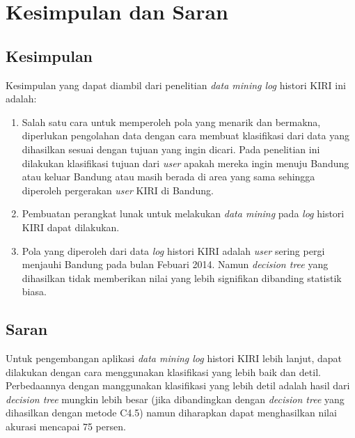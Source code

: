 \chapter{Kesimpulan dan Saran}

\section{Kesimpulan}

Kesimpulan yang dapat diambil dari penelitian \textsl{data mining log} histori KIRI ini adalah:

\begin{enumerate}
\item Salah satu cara untuk memperoleh pola yang menarik dan bermakna, diperlukan pengolahan data dengan cara membuat klasifikasi dari data yang dihasilkan sesuai dengan tujuan yang ingin dicari. Pada penelitian ini dilakukan klasifikasi tujuan dari \textsl{user} apakah mereka ingin menuju Bandung atau keluar Bandung atau masih berada di area yang sama sehingga diperoleh pergerakan \textsl{user} KIRI di Bandung.

\item Pembuatan perangkat lunak untuk melakukan \textsl{data mining} pada \textsl{log} histori KIRI dapat dilakukan.

\item Pola yang diperoleh dari data \textsl{log} histori KIRI adalah \textsl{user} sering pergi menjauhi Bandung pada bulan Febuari 2014. Namun \textsl{decision tree} yang dihasilkan tidak memberikan nilai yang lebih signifikan dibanding statistik biasa.
\end{enumerate}

\section{Saran}
Untuk pengembangan aplikasi \textsl{data mining log} histori KIRI lebih lanjut, dapat dilakukan dengan cara menggunakan klasifikasi yang lebih baik dan detil. Perbedaannya dengan manggunakan klasifikasi yang lebih detil adalah hasil dari \textsl{decision tree} mungkin lebih besar (jika dibandingkan dengan \textsl{decision tree} yang dihasilkan dengan metode C4.5) namun diharapkan dapat menghasilkan nilai akurasi mencapai 75 persen.

